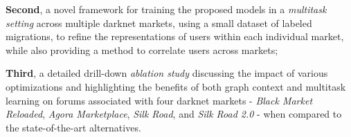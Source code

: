   \noindent \textbf {Second}, a novel framework for training the proposed models in a \textit{multitask setting} across multiple darknet markets, 
  using a small dataset of labeled migrations, 
  to refine the representations of users within each individual market, while also providing a method to correlate users across markets; 
  
\noindent \textbf{Third}, a detailed drill-down {\it ablation study} discussing the impact of various optimizations and highlighting the benefits of both graph context and multitask learning  on forums associated with four darknet markets - \textit{Black Market Reloaded}, \textit{Agora Marketplace}, \textit{Silk Road}, and \textit{Silk Road 2.0} -
 when compared to the state-of-the-art alternatives.
  
  